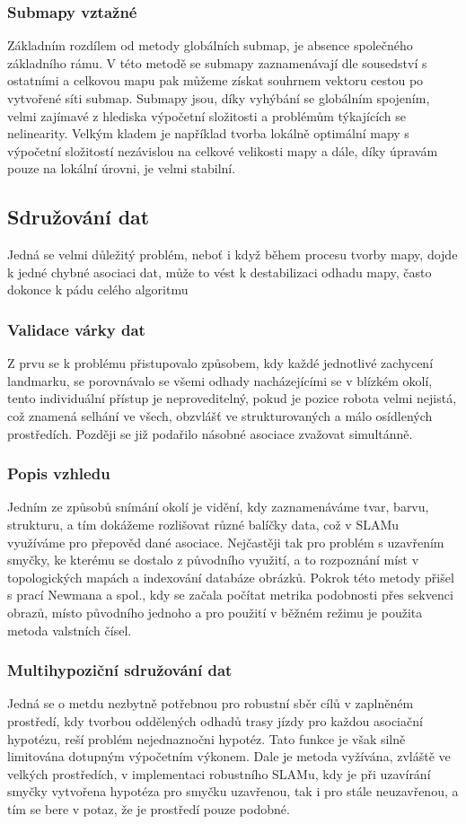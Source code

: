 \documentclass[11pt]{article}
\begin{document}
\subsubsection{Submapy vztažné}
Základním rozdílem od metody globálních submap, je absence společného základního rámu. V této metodě se submapy zaznamenávají dle sousedství s ostatními a celkovou mapu pak můžeme získat souhrnem vektoru cestou po vytvořené síti submap. Submapy jsou, díky vyhýbání se globálním spojením, velmi zajímavé z hlediska výpočetní složitosti a problémům týkajících se nelinearity. Velkým kladem je například tvorba lokálně optimální mapy s výpočetní složitostí nezávislou na celkové velikosti mapy a dále, díky úpravám pouze na lokální úrovni, je velmi stabilní.

\subsection{Sdružování dat}
Jedná se velmi důležitý problém, neboť i když během procesu tvorby mapy, dojde k jedné chybné asociaci dat, může to vést k destabilizaci odhadu mapy, často dokonce k pádu celého algoritmu
\subsubsection{Validace várky dat}
Z prvu se k problému přistupovalo způsobem, kdy každé jednotlivé zachycení landmarku, se porovnávalo se všemi odhady nacházejícími se v blízkém okolí, tento individuální přístup je neproveditelný, pokud je pozice robota velmi nejistá, což znamená selhání ve všech, obzvlášť ve strukturovaných a málo osídlených prostředích. Později se již podařilo násobné asociace zvažovat simultánně. 

\subsubsection{Popis vzhledu}
Jedním ze způsobů snímání okolí je vidění, kdy zaznamenáváme tvar, barvu, strukturu, a tím dokážeme rozlišovat různé balíčky data, což v SLAMu využíváme pro přepověd dané asociace. Nejčastěji tak pro problém s uzavřením smyčky, ke kterému se dostalo z původního využití, a to rozpoznání míst v topologických mapách a indexování databáze obrázků. Pokrok této metody přišel s prací Newmana a spol., kdy se začala počítat metrika podobnosti přes sekvenci obrazů, místo původního jednoho a pro použití v běžném režimu je použita metoda valstních čísel. 

\subsubsection{Multihypoziční sdružování dat}
Jedná se o metdu nezbytně potřebnou pro robustní sběr cílů v zaplněném prostředí, kdy tvorbou oddělených odhadů trasy jízdy pro každou asociační hypotézu, reší problém nejednaznočni hypotéz. Tato funkce je však silně limitována dotupným výpočetním výkonem. Dale je metoda vyžívána, zvláště ve velkých prostředích, v implementaci robustního SLAMu, kdy je při uzavírání smyčky vytvořena hypotéza pro smyčku uzavřenou, tak i pro stále neuzavřenou, a tím se bere v potaz, že je prostředí pouze podobné. 
\end{document}
